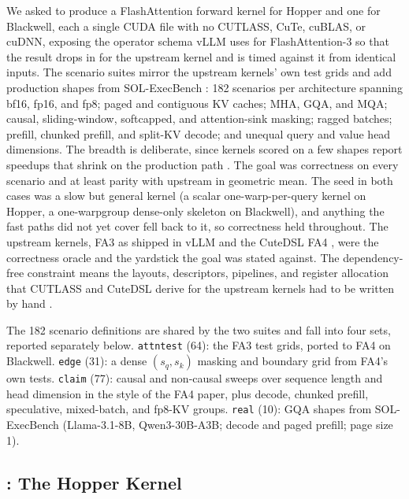 We asked \KernelSeek to produce a FlashAttention forward kernel for Hopper and one for
Blackwell, each a single CUDA file with no CUTLASS, CuTe, cuBLAS, or cuDNN, exposing the operator
schema vLLM uses for FlashAttention-3 so that the result drops in for the upstream kernel and is
timed against it from identical inputs. The scenario suites mirror the upstream kernels' own test
grids and add production shapes from SOL-ExecBench \cite{solexecbench}: 182 scenarios per
architecture spanning bf16, fp16, and fp8; paged and contiguous KV caches; MHA, GQA, and MQA; causal,
sliding-window, softcapped, and attention-sink masking; ragged batches; prefill, chunked prefill,
and split-KV decode; and unequal query and value head dimensions. The breadth is deliberate, since kernels scored on a few
shapes report speedups that shrink on the production path \cite{oliaro2026fastkernels}. The goal was correctness on every scenario and at least parity with upstream in geometric mean. The seed
in both cases was a slow but general kernel (a scalar one-warp-per-query kernel on Hopper, a
one-warpgroup dense-only skeleton on Blackwell), and anything the fast paths did not yet cover fell
back to it, so correctness held throughout. The upstream kernels, FA3 as shipped in vLLM and the
CuteDSL FA4 \cite{shah2024flashattention3,zadouri2026flashattention4}, were the correctness oracle
and the yardstick the goal was stated against. The dependency-free constraint means the layouts,
descriptors, pipelines, and register allocation that CUTLASS and CuteDSL derive for the upstream
kernels had to be written by hand \cite{nvidia2023cutlass}.

The 182 scenario definitions are shared by the two suites and fall into four sets, reported
separately below. \texttt{attntest} (64): the FA3 test grids, ported to FA4 on Blackwell.
\texttt{edge} (31): a dense $(s_q,s_k)$ masking and boundary grid from FA4's own tests.
\texttt{claim} (77): causal and non-causal sweeps over sequence length and head dimension in the
style of the FA4 paper, plus decode, chunked prefill, speculative, mixed-batch, and fp8-KV groups.
\texttt{real} (10): GQA shapes from SOL-ExecBench (Llama-3.1-8B, Qwen3-30B-A3B; decode and paged
prefill; page size 1).

\subsection{\ksFaThree: The Hopper Kernel}
\label{kernelseek:sec:kernels-fa3}

